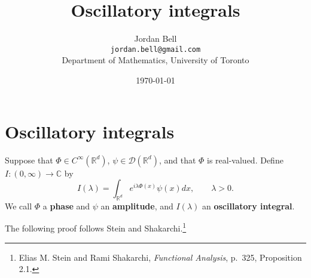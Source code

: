 \documentclass{article}
\theoremstyle{definition}
\begin{document}
\title{Oscillatory integrals}
\author{Jordan Bell\\ \texttt{jordan.bell@gmail.com}\\Department of Mathematics, University of Toronto}
\date{\today}

\maketitle

\section{Oscillatory integrals}
Suppose that $\Phi \in C^\infty(\mathbb{R}^d)$, $\psi \in \mathscr{D}(\mathbb{R}^d)$, and that $\Phi$ is real-valued. Define
$I:(0,\infty) \to \mathbb{C}$ 
by
\[
I(\lambda) = \int_{\mathbb{R}^d} e^{i\lambda \Phi(x)} \psi(x) dx, \qquad \lambda>0.
\]
We call $\Phi$ a \textbf{phase} and $\psi$ an \textbf{amplitude}, and $I(\lambda)$ an \textbf{oscillatory integral}.

The following proof follows Stein and Shakarchi.\footnote{Elias
M. Stein and Rami Shakarchi, {\em Functional Analysis}, p.~325, Proposition 2.1.}
\end{document}

